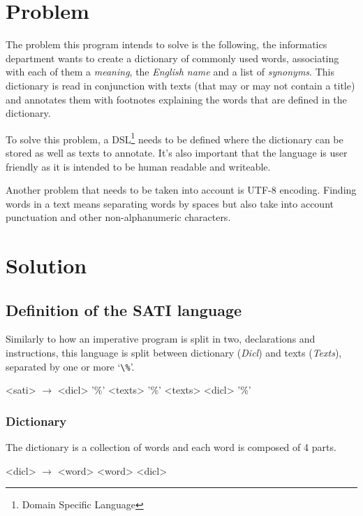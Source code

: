 \documentclass[a4paper]{report}
\begin{document}
\chapter{Problem}

The problem this program intends to solve is the following, the informatics
department wants to create a dictionary of commonly used words, associating
with each of them a \textit{meaning}, the \textit{English name} and a list of
\textit{synonyms}. This dictionary is read in conjunction with texts (that may
or may not contain a title) and annotates them with footnotes explaining the
words that are defined in the dictionary.

To solve this problem, a DSL\footnote{Domain Specific Language} needs to be
defined where the dictionary can be stored as well as texts to annotate. It's
also important that the language is user friendly as it is intended to be
human readable and writeable.

Another problem that needs to be taken into account is UTF-8 encoding. Finding
words in a text means separating words by spaces but also take into account
punctuation and other non-alphanumeric characters.

\chapter{Solution}\label{cha:solution}

\section{Definition of the SATI language}

Similarly to how an imperative
program is split in two, declarations and instructions, this language is split
between dictionary (\textit{Dicl}) and texts (\textit{Texts}), separated by one or more `\verb!\%!'.

\begin{grammar}
    <sati> $\to$ <dicl> '\%' <texts>
    \alt '\%' <texts>
    \alt <dicl> '\%'
\end{grammar}

\subsection{Dictionary}

The dictionary is a collection of words and each word is composed of 4 parts.

\begin{grammar}
    <dicl> $\to$ <word>
    \alt <word> <dicl>
\end{grammar}
\end{document}
